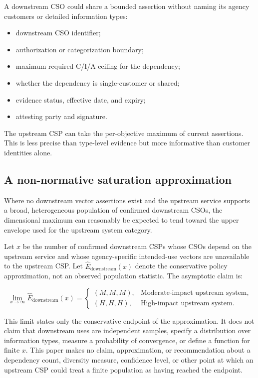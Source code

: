 \documentclass[11pt]{article}
\begin{document}
A downstream CSO could share a bounded assertion without naming its agency
customers or detailed information types:

\begin{itemize}[leftmargin=1.5em]
\item downstream CSO identifier;
\item authorization or categorization boundary;
\item maximum required C/I/A ceiling for the dependency;
\item whether the dependency is single-customer or shared;
\item evidence status, effective date, and expiry;
\item attesting party and signature.
\end{itemize}

The upstream CSP can take the per-objective maximum of current assertions. This is
less precise than type-level evidence but more informative than customer identities
alone.

\subsection{A non-normative saturation approximation}

Where no downstream vector assertions exist and the upstream service supports a
broad, heterogeneous population of confirmed downstream CSOs, the dimensional
maximum can reasonably be expected to tend toward the upper envelope used for the
upstream system category.

Let $x$ be the number of confirmed downstream CSPs whose CSOs depend on the
upstream service and whose agency-specific intended-use vectors are unavailable to
the upstream CSP. Let $\widehat{E}_{\mathrm{downstream}}(x)$ denote the conservative
policy approximation, not an observed population statistic. The asymptotic claim is:

\[
\lim_{x\to\infty}\widehat{E}_{\mathrm{downstream}}(x)=
\begin{cases}
(M,M,M), & \text{Moderate-impact upstream system},\\
(H,H,H), & \text{High-impact upstream system}.
\end{cases}
\]

This limit states only the conservative endpoint of the approximation. It does not
claim that downstream uses are independent samples, specify a distribution over
information types, measure a probability of convergence, or define a function for
finite $x$. This paper makes no claim, approximation, or recommendation about a
dependency count, diversity measure, confidence level, or other point at which an
upstream CSP could treat a finite population as having reached the endpoint.
\end{document}
